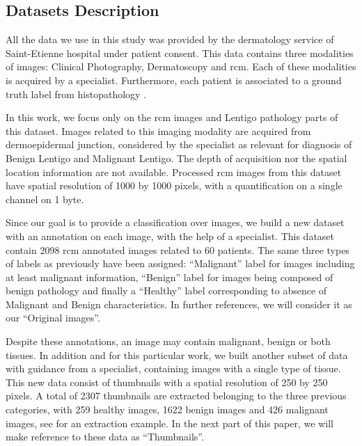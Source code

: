 \subsection{Datasets Description}
All the data we use in this study was provided by the dermatology service of Saint-Etienne hospital under patient consent. This data contains three modalities of images: Clinical Photography, Dermatoscopy and \ac{rcm}. Each of these modalities is acquired by a specialist. Furthermore, each patient is associated to a ground truth label from histopathology \cite{Cinotti2018}.\par
In this work, we focus only on the \ac{rcm} images and Lentigo pathology parts of this dataset. Images related to this imaging modality are acquired from dermoepidermal junction, considered by the specialist as relevant for diagnosis of Benign Lentigo and Malignant Lentigo. The depth of acquisition nor the spatial location information are not available. Processed \ac{rcm} images from this dataset have spatial resolution of 1000 by 1000 pixels, with a quantification on a single channel on 1 byte.\par
Since our goal is to provide a classification over images, we build a new dataset with an annotation on each image, with the help of a specialist. This dataset contain 2098 \ac{rcm} annotated images related to 60 patients. The same three types of labels as previously have been assigned: “Malignant” label for images including at least malignant information, “Benign” label for images being composed of benign pathology and finally a “Healthy” label corresponding to absence of Malignant and Benign characteristics. In further references, we will consider it as our “Original images”.\par
Despite these annotations, an image may contain malignant, benign or both tissues. In addition and for this particular work, we built another subset of data with guidance from a specialist, containing images with a single type of tissue. This new data consist of thumbnails with a spatial resolution of 250 by 250 pixels. A total of 2307 thumbnails are extracted belonging to the three previous categories, with 259 healthy images, 1622 benign images and 426 malignant images, see  for an extraction example. In the next part of this paper, we will make reference to these data as “Thumbnails”.
